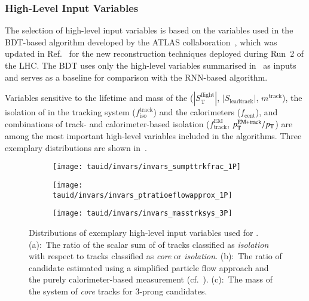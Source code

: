 \subsubsection{High-Level Input Variables}

The selection of high-level input variables is based on the variables used in
the BDT-based \tauid algorithm developed by the ATLAS
collaboration~\cite{ATL-PHYS-PUB-2015-045}, which was updated in
Ref.~\cite{cdeutsch-master} for the new \tauhadvis reconstruction techniques
deployed during Run~2 of the LHC. The BDT \tauid uses only the high-level
variables summarised in~ as inputs and serves as
a baseline for comparison with the RNN-based algorithm.

Variables sensitive to the lifetime and mass of the \taulepton
($|S_{\text{T}}^{\text{flight}}|$, $|S_{\text{leadtrack}}|$,
$m^{\text{track}}$), the isolation of \tauhadvis in the tracking
system ($f_{\text{iso}}^{\text{track}}$) and the calorimeters
($f_{\text{cent}}$), and combinations of track- and calorimeter-based
isolation ($f_{\text{track}}^{\text{EM}}$,
$p_{\text{T}}^{\text{EM+track}} / p_{\text{T}}$) are among the most important
high-level variables included in the \tauid algorithms. Three
exemplary distributions are shown in~.


\begin{figure}[htbp]
  \centering

  \begin{subfigure}{0.33\textwidth}
    \texttt{[image: tauid/invars/invars\_sumpttrkfrac\_1P]}
    \subcaption{}
  \end{subfigure}\hfill%
  \begin{subfigure}{0.33\textwidth}
    \texttt{[image: tauid/invars/invars\_ptratioeflowapprox\_1P]}
    \subcaption{}
  \end{subfigure}\hfill%
  \begin{subfigure}{0.33\textwidth}
    \texttt{[image: tauid/invars/invars\_masstrksys\_3P]}
    \subcaption{}
  \end{subfigure}

  \caption[Distributions of exemplary high-level input variables used for
  \tauid.]{Distributions of exemplary high-level input variables used for
    \tauid. (a):~The ratio of the scalar sum of \pT of tracks classified as
    \emph{isolation} with respect to tracks classified as \emph{core} or
    \emph{isolation}. (b):~The ratio of \tauhadvis candidate \pT estimated using
    a simplified particle flow approach and the purely calorimeter-based
    measurement (cf.~). (c):~The mass of the
    system of \emph{core} tracks for 3-prong \tauhadvis candidates.}%
  \label{fig:tauid_high_level_vars}
\end{figure}


